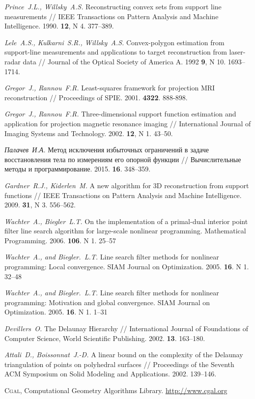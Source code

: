 \documentclass[a4paper, 10pt]{article}
\theoremstyle{definition}
\theoremstyle{plain}
\theoremstyle{plain}
\begin{document}
\begin{thebibliography}{50}

\emph{Prince~J.L., Willsky~A.S.}
Reconstructing convex sets from support line measurements //
IEEE Transactions on Pattern Analysis and Machine Intelligence.
1990.
\textbf{12},
N 4.
377--389.

\emph{Lele~A.S., Kulkarni~S.R., Willsky~A.S.}
Convex-polygon estimation from support-line measurements and applications to
target reconstruction from laser-radar data //
Journal of the Optical Society of America A.
1992
\textbf{9},
N 10.
1693--1714.

\emph{Gregor~J., Rannou~F.R.}
Least-squares framework for projection {MRI} reconstruction //
Proceedings of SPIE.
2001.
\textbf{4322}.
888-898.

\emph{Gregor~J., Rannou~F.R.}
Three-dimensional support function estimation and application for projection
magnetic resonance imaging //
International Journal of Imaging Systems and Technology.
2002.
\textbf{12},
N 1.
43--50.

\emph{Палачев~И.А.}
Метод исключения избыточных ограничений в задаче восстановления тела по
измерениям его опорной функции //
Вычислительные методы и программирование.
2015.
\textbf{16}.
348--359.

\emph{Gardner~R.J., Kiderlen~M.}
A new algorithm for 3D reconstruction from support functions //
IEEE Transactions on Pattern Analysis and Machine Intelligence.
2009.
\textbf{31},
N 3.
556--562.

\emph{Wachter~A., Biegler~L.T.}
On the implementation of a primal-dual interior point filter line search
algorithm for large-scale nonlinear programming.
Mathematical Programming.
2006.
\textbf{106}.
N 1.
25--57

\emph{Wachter~A., and Biegler.~L.T.}
Line search filter methods for nonlinear programming: Local convergence.
SIAM Journal on Optimization.
2005.
\textbf{16}.
N 1.
32--48

\emph{Wachter~A., and Biegler.~L.T.}
Line search filter methods for nonlinear programming: Motivation and global
convergence.
SIAM Journal on Optimization.
2005.
\textbf{16}.
N 1.
1--31

\emph{Devillers~O.}
The Delaunay Hierarchy //
International Journal of Foundations of Computer Science,
World Scientific Publishing.
2002.
\textbf{13}.
163--180.

\emph{Attali~D., Boissonnat~J.-D.}
A linear bound on the complexity of the Delaunay triangulation of points on
polyhedral surfaces //
Proceedings of the Seventh ACM Symposium on Solid Modeling and Applications.
2002.
139--146.

\textsc{Cgal}, {C}omputational {G}eometry {A}lgorithms {L}ibrary.
\url{http://www.cgal.org}

\end{thebibliography}
\end{document}
